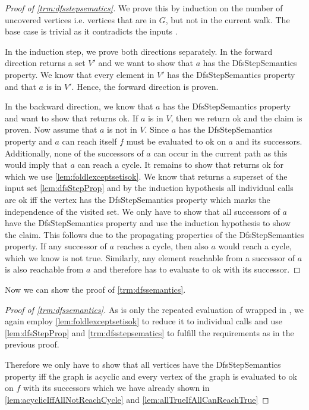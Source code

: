 \begin{proof}[Proof of \cref{trm:dfsstepsematics}]
  We prove this by induction on the number of uncovered vertices i.e. vertices that are in $G$, but not in the current walk. The base case is trivial as it contradicts the inputs \dfsstep.

  In the induction step, we prove both directions separately. In the forward direction \dfsstep returns a set $V'$ and we want to show that $a$ has the DfsStepSemantics property. We know that every element in  $V'$ has the DfsStepSemantics property and that $a$ is in $V'$. Hence, the forward direction is proven.

  In the backward direction, we know that $a$ has the DfsStepSemantics property and want to show that \dfsstep returns ok. If $a$ is in $V$, then we return ok and the claim is proven. Now assume that $a$ is not in $V$. Since $a$ has the DfsStepSemantics property and $a$ can reach itself $f$ must be evaluated to ok on $a$ and its successors. Additionally, none of the successors of $a$ can occur in the current path as this would imply that $a$ can reach a cycle. 
  It remains to show that \foldlexceptset returns ok for which we use \cref{lem:foldlexceptsetisok}. We know that \dfsstep returns a superset of the input set \cref{lem:dfsStepProp} and by the induction hypothesis all individual calls are ok iff the vertex has the DfsStepSemantics property which marks the independence of the visited set. We only have to show that all successors of $a$ have the DfsStepSemantics property and use the induction hypothesis to show the claim. This follows due to the propagating properties of the DfsStepSemantics property. If any successor of $a$ reaches a cycle, then also $a$ would reach a cycle, which we know is not true. Similarly, any element reachable from a successor of $a$ is also reachable from $a$ and therefore has to evaluate to ok with its successor.
\end{proof}

Now we can show the proof of \cref{trm:dfssemantics}.

\begin{proof}[Proof of \cref{trm:dfssemantics}]
  As \dfs is only the repeated evaluation of \dfsstep wrapped in \foldlexceptset, we again employ \cref{lem:foldlexceptsetisok} to reduce it to individual calls and use \cref{lem:dfsStepProp} and \cref{trm:dfsstepsematics} to fulfill the requirements as in the previous proof. 

  Therefore we only have to show that all vertices have the DfsStepSemantics property iff the graph is acyclic and every vertex of the graph is evaluated to ok on $f$ with its successors which we have already shown in \cref{lem:acyclicIffAllNotReachCycle} and \cref{lem:allTrueIfAllCanReachTrue}
\end{proof}


